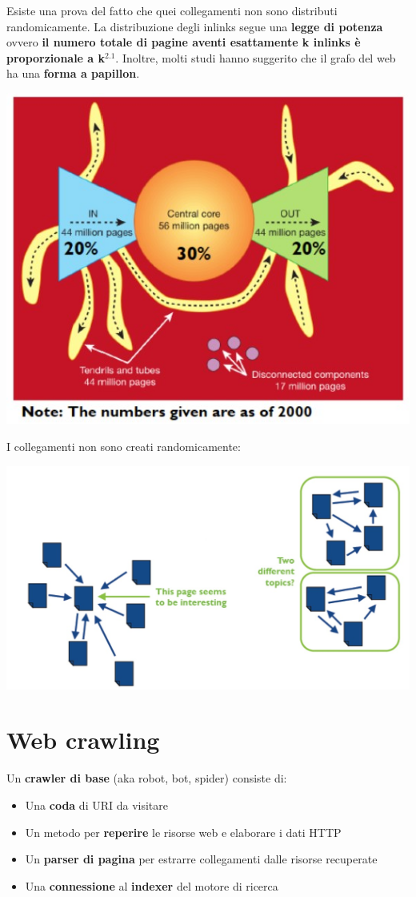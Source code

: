 Esiste una prova del fatto che quei collegamenti non sono distributi randomicamente. La distribuzione degli inlinks segue una \textbf{legge di potenza} ovvero \textbf{il numero totale di pagine aventi esattamente k inlinks è proporzionale a k}$^{2.1}$.
Inoltre, molti studi hanno suggerito che il grafo del web ha una \textbf{forma a papillon}. 
\begin{center}
    \includegraphics[scale=0.4]{Images/TecnologieWeb/7/BowTie.jpg}
\end{center}
I collegamenti non sono creati randomicamente:
\begin{center}
    \includegraphics[scale=0.4]{Images/TecnologieWeb/7/WebGraph.jpg}
\end{center}

\section{Web crawling}
Un \textbf{crawler di base} (aka robot, bot, spider) consiste di:
\begin{itemize}
    \item Una \textbf{coda} di URI da visitare
    \item Un metodo per \textbf{reperire} le risorse web e elaborare i dati HTTP
    \item Un \textbf{parser di pagina} per estrarre collegamenti dalle risorse recuperate
    \item Una \textbf{connessione} al \textbf{indexer} del motore di ricerca
\end{itemize}

